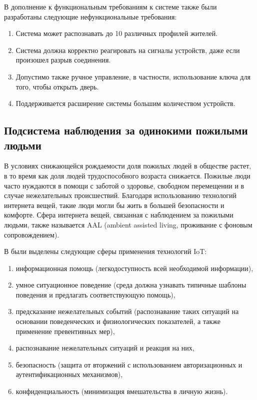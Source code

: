 В дополнение к функциональным требованиям к системе также были разработаны следующие нефункциональные требования:

\begin{enumerate}
	\item Система может распознавать до 10 различных профилей жителей.
	\item Система должна корректно реагировать на сигналы устройств, даже если произошел разрыв соединения.
	\item Допустимо также ручное управление, в частности, использование ключа для того, чтобы открыть дверь.
	\item Поддерживается расширение системы большим количеством устройств.
\end{enumerate}

\subsection{Подсистема наблюдения за одинокими пожилыми людьми}

В условиях снижающейся рождаемости доля пожилых людей в обществе растет, в то время как доля людей трудоспособного возраста снижается. Пожилые люди часто нуждаются в помощи с заботой о здоровье, свободном перемещении и в случае нежелательных происшествий. Благодаря использованию технологий интернета вещей, такие люди могли бы жить в большей безопасности и комфорте. Сфера интернета вещей, связанная с наблюдением за пожилыми людьми, также называется AAL (ambient assisted living, проживание с фоновым сопровождением).

В  были выделены следующие сферы применения технологий IoT:

\begin{enumerate}
	\item информационная 	помощь 	(легкодоступность 	всей 	необходимой информации),
	\item умное ситуационное поведение (среда должна узнавать типичные шаблоны поведения и предлагать соответствующую помощь),
	\item предсказание нежелательных событий (распознавание таких ситуаций на основании поведенческих и физиологических показателей, а также применение превентивных мер),
	\item распознавание нежелательных ситуаций и реакция на них,
	\item безопасность (защита от вторжений с использованием авторизационных и аутентификационных механизмов),
	\item конфиденциальность (минимизация вмешательства в личную жизнь).
\end{enumerate}

